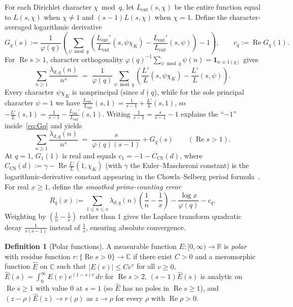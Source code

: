 \documentclass[11pt]{amsart}
\newcommand{\CC}{\mathbb{C}}
\newcommand{\RR}{\mathbb{R}}
\newcommand{\re}{\operatorname{Re}}
\theoremstyle{definition}
\newtheorem{definition}[theorem]{Definition}
\theoremstyle{remark}
\begin{document}
For each Dirichlet character $\chi\bmod q$, let $L_{\mathrm{ent}}(s,\chi)$ be the entire function equal to $L(s,\chi)$ when $\chi\ne 1$ and $(s-1)L(s,\chi)$ when $\chi=1$. Define the character-averaged logarithmic derivative
\begin{equation}\label{eq:Gq}
 G_q(s) := \frac{1}{\varphi(q)}\left(\sum_{\psi\bmod q}\left(\frac{L_{\mathrm{ent}}'}{L_{\mathrm{ent}}}(s,\psi\chi_K)-\frac{L_{\mathrm{ent}}'}{L_{\mathrm{ent}}}(s,\psi)\right)-1\right),
 \qquad c_q := \re G_q(1).
\end{equation}
For $\re s>1$, character orthogonality $\varphi(q)^{-1}\sum_{\psi\bmod q}\psi(n)=\mathbf{1}_{n\equiv 1(q)}$ gives
\[
 \sum_{n\ge 1}\frac{\lambda_{d,q}(n)}{n^s}
 \;=\; \frac{1}{\varphi(q)}\sum_{\psi\bmod q}\left(\frac{L'}{L}(s,\psi\chi_K)-\frac{L'}{L}(s,\psi)\right).
\]
Every character $\psi\chi_K$ is nonprincipal (since $d\nmid q$), while for the sole principal character $\psi=1$ we have $\frac{L_{\mathrm{ent}}'}{L_{\mathrm{ent}}}(s,1)=\frac{1}{s-1}+\frac{L'}{L}(s,1)$, so $-\frac{L'}{L}(s,1)=\frac{1}{s-1}-\frac{L_{\mathrm{ent}}'}{L_{\mathrm{ent}}}(s,1)$. Writing $\frac{1}{s-1}=\frac{s}{s-1}-1$ explains the ``$-1$'' inside~\eqref{eq:Gq} and yields
\[
 \sum_{n\ge 1}\frac{\lambda_{d,q}(n)}{n^s} \;=\; \frac{s}{\varphi(q)(s-1)} + G_q(s) \qquad (\re s>1).
\]
At $q=1$, $G_1(1)$ is real and equals $c_1=-1-C_{\mathrm{CS}}(d)$, where $C_{\mathrm{CS}}(d):=\gamma-\re\frac{L'}{L}(1,\chi_K)$ (with $\gamma$ the Euler--Mascheroni constant) is the logarithmic-derivative constant appearing in the Chowla--Selberg period formula~\cite{CS67}. For real $x\ge 1$, define the \emph{smoothed prime-counting error}
\begin{equation}\label{eq:Rq}
 R_q(x) := \sum_{1\le n\le x}\lambda_{d,q}(n)\!\left(\frac{1}{n}-\frac{1}{x}\right)-\frac{\log x}{\varphi(q)}-c_q.
\end{equation}
Weighting by $(\frac1n-\frac1x)$ rather than $1$ gives the Laplace transform quadratic decay $\frac{1}{s(s-1)}$ instead of $\frac1s$, ensuring absolute convergence.

\begin{definition}[Polar functions]\label{def:polar}
A measurable function $E\colon[0,\infty)\to\RR$ is \emph{polar} with residue function $r\colon\{\re s>0\}\to\CC$ if there exist $C>0$ and a meromorphic function $\widehat{E}$ on $\CC$ such that $|E(v)|\le Ce^v$ for all $v\ge 0$, $\widehat{E}(s)=\int_0^\infty E(v)e^{(1-s)v}\,dv$ for $\re s>2$, $(s-1)\widehat{E}(s)$ is analytic on $\re s\ge 1$ with value $0$ at $s=1$ (so $\widehat{E}$ has no poles in $\re s\ge 1$), and $(z-\rho)\widehat{E}(z)\to r(\rho)$ as $z\to\rho$ for every $\rho$ with $\re\rho>0$.
\end{definition}
\end{document}
